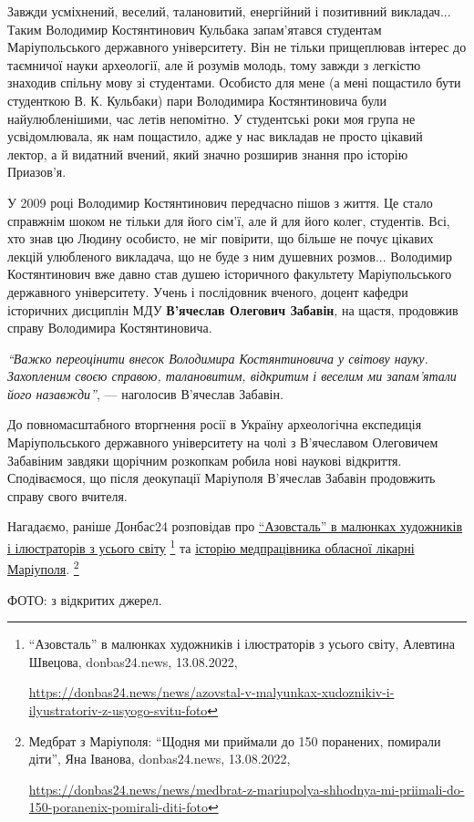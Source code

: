 
Завжди усміхнений, веселий, талановитий, енергійний і позитивний викладач...
Таким Володимир Костянтинович Кульбака запам'ятався студентам Маріупольського
державного університету. Він не тільки прищеплював інтерес до таємничої науки
археології, але й розумів молодь, тому завжди з легкістю знаходив спільну мову
зі студентами. Особисто для мене (а мені пощастило бути студенткою В. К.
Кульбаки) пари Володимира Костянтиновича були найулюбленішими, час летів
непомітно. У студентські роки моя група не усвідомлювала, як нам пощастило,
адже у нас викладав не просто цікавий лектор, а й видатний вчений, який значно
розширив знання про історію Приазов'я.

У 2009 році Володимир Костянтинович передчасно пішов з життя. Це стало
справжнім шоком не тільки для його сім'ї, але й для його колег, студентів. Всі,
хто знав цю Людину особисто, не міг повірити, що більше не почує цікавих лекцій
улюбленого викладача, що не буде з ним душевних розмов... Володимир Костянтинович
вже давно став душею історичного факультету Маріупольського державного
університету. Учень і послідовник вченого, доцент кафедри історичних дисциплін
МДУ \textbf{В'ячеслав Олегович Забавін}, на щастя, продовжив справу Володимира
Костянтиновича.

\begin{leftbar}
\emph{\enquote{Важко переоцінити внесок Володимира Костянтиновича у світову науку.
Захопленим своєю справою, талановитим, відкритим і веселим ми запам'ятали його
назавжди}}, — наголосив В'ячеслав Забавін.
\end{leftbar}

До повномасштабного вторгнення росії в Україну археологічна експедиція
Маріупольського державного університету на чолі з В'ячеславом Олеговичем
Забавіним завдяки щорічним розкопкам робила нові наукові відкриття.
Сподіваємося, що після деокупації Маріуполя В'ячеслав Забавін продовжить справу
свого вчителя.

Нагадаємо, раніше Донбас24 розповідав про \href{https://donbas24.news/news/azovstal-v-malyunkax-xudoznikiv-i-ilyustratoriv-z-usyogo-svitu-foto}{\enquote{Азовсталь} в малюнках художників і
ілюстраторів з усього світу}%
\footnote{\enquote{Азовсталь} в малюнках художників і ілюстраторів з усього світу, Алевтина Швецова, donbas24.news, 13.08.2022, \par\url{https://donbas24.news/news/azovstal-v-malyunkax-xudoznikiv-i-ilyustratoriv-z-usyogo-svitu-foto}}
та \href{https://donbas24.news/news/medbrat-z-mariupolya-shhodnya-mi-priimali-do-150-poranenix-pomirali-diti-foto}{історію медпрацівника обласної лікарні Маріуполя}.%
\footnote{Медбрат з Маріуполя: \enquote{Щодня ми приймали до 150 поранених, помирали діти}, Яна Іванова, donbas24.news, 13.08.2022, \par\url{https://donbas24.news/news/medbrat-z-mariupolya-shhodnya-mi-priimali-do-150-poranenix-pomirali-diti-foto}}

ФОТО: з відкритих джерел.

